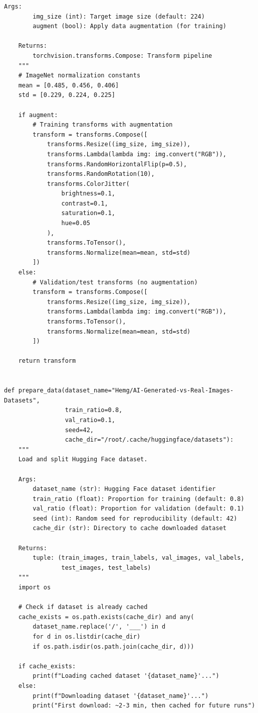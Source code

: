 \documentclass[man,12pt,letterpaper,donotrepeattitle,floatsintext]{apa7}
\begin{document}
\begin{lstlisting}[style=pythonstyle]
    Args:
        img_size (int): Target image size (default: 224)
        augment (bool): Apply data augmentation (for training)
    
    Returns:
        torchvision.transforms.Compose: Transform pipeline
    """
    # ImageNet normalization constants
    mean = [0.485, 0.456, 0.406]
    std = [0.229, 0.224, 0.225]
    
    if augment:
        # Training transforms with augmentation
        transform = transforms.Compose([
            transforms.Resize((img_size, img_size)),
            transforms.Lambda(lambda img: img.convert("RGB")),
            transforms.RandomHorizontalFlip(p=0.5),
            transforms.RandomRotation(10),
            transforms.ColorJitter(
                brightness=0.1,
                contrast=0.1,
                saturation=0.1,
                hue=0.05
            ),
            transforms.ToTensor(),
            transforms.Normalize(mean=mean, std=std)
        ])
    else:
        # Validation/test transforms (no augmentation)
        transform = transforms.Compose([
            transforms.Resize((img_size, img_size)),
            transforms.Lambda(lambda img: img.convert("RGB")),
            transforms.ToTensor(),
            transforms.Normalize(mean=mean, std=std)
        ])
    
    return transform


def prepare_data(dataset_name="Hemg/AI-Generated-vs-Real-Images-Datasets",
                 train_ratio=0.8,
                 val_ratio=0.1,
                 seed=42,
                 cache_dir="/root/.cache/huggingface/datasets"):
    """
    Load and split Hugging Face dataset.
    
    Args:
        dataset_name (str): Hugging Face dataset identifier
        train_ratio (float): Proportion for training (default: 0.8)
        val_ratio (float): Proportion for validation (default: 0.1)
        seed (int): Random seed for reproducibility (default: 42)
        cache_dir (str): Directory to cache downloaded dataset
    
    Returns:
        tuple: (train_images, train_labels, val_images, val_labels, 
                test_images, test_labels)
    """
    import os
    
    # Check if dataset is already cached
    cache_exists = os.path.exists(cache_dir) and any(
        dataset_name.replace('/', '___') in d 
        for d in os.listdir(cache_dir) 
        if os.path.isdir(os.path.join(cache_dir, d)))
    
    if cache_exists:
        print(f"Loading cached dataset '{dataset_name}'...")
    else:
        print(f"Downloading dataset '{dataset_name}'...")
        print("First download: ~2-3 min, then cached for future runs")
    

\end{lstlisting}
\end{document}
